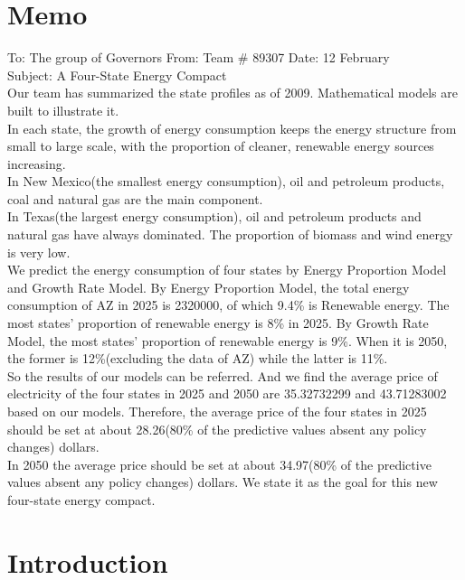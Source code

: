 \documentclass{mcmthesis}
\begin{document}
\section{Memo}
To: The group of Governors From: Team \# 89307 Date: 12 February \\Subject: A Four-State Energy Compact\\
Our team has summarized the state profiles as of 2009. Mathematical models are built to illustrate it.\\
In each state, the growth of energy consumption keeps the energy structure from small to large scale, with the proportion of cleaner, renewable energy sources increasing.\\
In New Mexico(the smallest energy consumption), oil and petroleum products, coal and natural gas are the main component.\\
In Texas(the largest energy consumption), oil and petroleum products and natural gas have always dominated. The proportion of biomass and wind energy is very low.\\
We predict the energy consumption of four states by Energy Proportion Model and Growth Rate Model. 
By Energy Proportion Model, the total energy consumption of AZ in 2025 is 2320000, of which 9.4\% is Renewable energy. The most states' proportion of renewable energy is 8\% in 2025.
By Growth Rate Model, the most states' proportion of renewable energy is 9\%.
When it is 2050, the former is 12\%(excluding the data of AZ) while the latter is 11\%.\\
So the results of our models can be referred.
And we find the average price of electricity of the four states in 2025 and 2050 are 35.32732299 and 43.71283002 based on our models.
Therefore, the average price of the four states in 2025 should be set at about 28.26(80\% of the predictive values absent any policy changes) dollars.\\
In 2050 the average price should be set at about 34.97(80\% of the predictive values absent any policy changes) dollars. We state it as the goal for this new four-state energy compact.
\section{Introduction}
\end{document}
